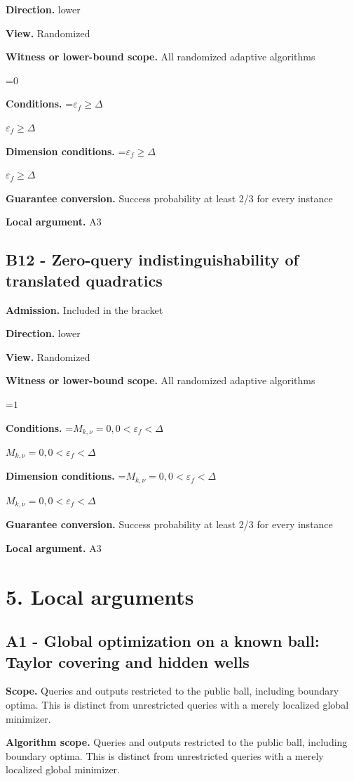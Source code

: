 \documentclass[10pt,a4paper]{article}
\newcommand{\AtlasMath}[1]{\par\begingroup\centering\setbox0=\hbox{$\displaystyle #1$}\ifdim\wd0>1.4\linewidth\typeout{ATLAS WIDE FORMULA: \the\wd0}\fi\ifdim\wd0>\linewidth\resizebox{\linewidth}{!}{\box0}\else\box0\fi\par\endgroup}
\newcommand{\AtlasInlineMath}[1]{\begingroup\setbox0=\hbox{$#1$}\ifdim\wd0>.4\linewidth\endgroup\AtlasMath{#1}\else\endgroup$#1$\fi}
\begin{document}
\textbf{Direction.} lower

\textbf{View.} Randomized

\textbf{Witness or lower-bound scope.} All randomized adaptive algorithms

\AtlasMath{0}
\textbf{Conditions.} \AtlasInlineMath{\varepsilon_f\ge \Delta}

\textbf{Dimension conditions.} \AtlasInlineMath{\varepsilon_f\ge \Delta}

\textbf{Guarantee conversion.} Success probability at least 2/3 for every instance

\textbf{Local argument.} A3

\subsection{B12 - Zero-query indistinguishability of translated quadratics}
\textbf{Admission.} Included in the bracket

\textbf{Direction.} lower

\textbf{View.} Randomized

\textbf{Witness or lower-bound scope.} All randomized adaptive algorithms

\AtlasMath{1}
\textbf{Conditions.} \AtlasInlineMath{M_{k,\nu}=0,0<\varepsilon_f<\Delta}

\textbf{Dimension conditions.} \AtlasInlineMath{M_{k,\nu}=0,0<\varepsilon_f<\Delta}

\textbf{Guarantee conversion.} Success probability at least 2/3 for every instance

\textbf{Local argument.} A3

\section{5. Local arguments}
\subsection{A1 - Global optimization on a known ball: Taylor covering and hidden wells}
\textbf{Scope.} Queries and outputs restricted to the public ball, including boundary optima. This is distinct from unrestricted queries with a merely localized global minimizer.

\textbf{Algorithm scope.} Queries and outputs restricted to the public ball, including boundary optima. This is distinct from unrestricted queries with a merely localized global minimizer.
\end{document}
